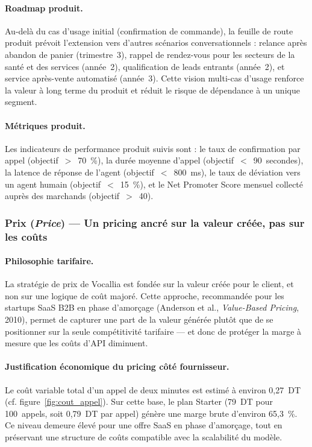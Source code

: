 \paragraph{Roadmap produit.}
Au-delà du cas d'usage initial (confirmation de commande), la feuille de route
produit prévoit l'extension vers d'autres scénarios conversationnels : relance
après abandon de panier (trimestre~3), rappel de rendez-vous pour les secteurs
de la santé et des services (année~2), qualification de leads entrants (année~2),
et service après-vente automatisé (année~3). Cette vision multi-cas d'usage
renforce la valeur à long terme du produit et réduit le risque de dépendance à
un unique segment.

\paragraph{Métriques produit.}
Les indicateurs de performance produit suivis sont : le taux de confirmation par
appel (objectif~$>$~70~\%), la durée moyenne d'appel (objectif~$<$~90~secondes),
la latence de réponse de l'agent (objectif~$<$~800~ms), le taux de déviation vers
un agent humain (objectif~$<$~15~\%), et le Net Promoter Score mensuel collecté
auprès des marchands (objectif~$>$~40).

\subsubsection{Prix (\textit{Price}) --- Un pricing ancré sur la valeur créée,
pas sur les coûts}

\paragraph{Philosophie tarifaire.}
La stratégie de prix de Vocallia est fondée sur la valeur créée pour le client,
et non sur une logique de coût majoré. Cette approche, recommandée pour les
startups SaaS B2B en phase d'amorçage (Anderson et al., \textit{Value-Based
Pricing}, 2010), permet de capturer une part de la valeur générée plutôt que
de se positionner sur la seule compétitivité tarifaire --- et donc de protéger
la marge à mesure que les coûts d'API diminuent.

\paragraph{Justification économique du pricing côté fournisseur.}
Le coût variable total d'un appel de deux minutes est estimé à environ 0,27~DT
(cf. figure~\ref{fig:cout_appel}). Sur cette base,
le plan Starter (79~DT pour 100~appels, soit 0,79~DT par appel) génère une marge
brute d'environ 65,3~\%. Ce niveau demeure élevé pour une offre SaaS en phase
d'amorçage, tout en préservant une structure de coûts compatible avec la scalabilité
du modèle.

